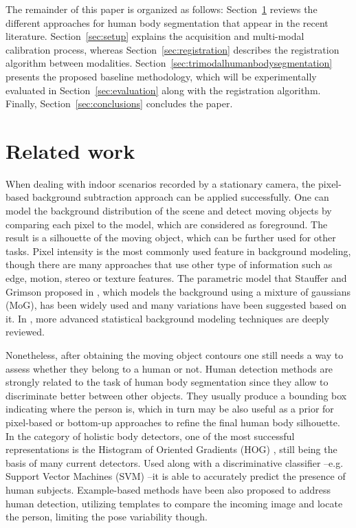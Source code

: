 \documentclass[10pt,twocolumn,letterpaper]{article}
\begin{document}
The remainder of this paper is organized as follows: Section~\ref{sec:relatedwork} reviews the different approaches for human body segmentation that appear in the recent literature. Section~\ref{sec:setup} explains the acquisition and multi-modal calibration process, whereas Section~\ref{sec:registration} describes the registration algorithm between modalities. Section~\ref{sec:trimodalhumanbodysegmentation} presents the proposed baseline methodology, which will be experimentally evaluated in Section~\ref{sec:evaluation} along with the registration algorithm. Finally, Section~\ref{sec:conclusions} concludes the paper.

\section{Related work}
\label{sec:relatedwork}
 
 When dealing with indoor scenarios recorded by a stationary camera, the pixel-based background subtraction approach can be applied successfully. One can model the background distribution of the scene and detect moving objects by comparing each pixel to the model, which are considered as foreground. The result is a silhouette of the moving object, which can be further used for other tasks. Pixel intensity is the most commonly used feature in background modeling, though there are many approaches that use other type of information such as edge, motion, stereo or texture features. The parametric model that Stauffer and Grimson proposed in \cite{stauffer1999adaptive}, which models the background using a mixture of gaussians (MoG), has been widely used and many variations have been suggested based on it. In \cite{bouwmans2011recent}, more advanced statistical background modeling techniques are deeply reviewed. 
 
Nonetheless, after obtaining the moving object contours one still needs a way to assess whether they belong to a human or not. Human detection methods are strongly related to the task of human body segmentation since they allow to discriminate better between other objects. They usually produce a bounding box indicating where the person is, which in turn may be also useful as a prior for pixel-based or bottom-up approaches to refine the final human body silhouette. In the category of holistic body detectors, one of the most successful representations is the Histogram of Oriented Gradients (HOG) \cite{dalal2005histograms}, still being the basis of many current detectors. Used along with a discriminative classifier --e.g. Support Vector Machines (SVM) \cite{hearst1998support} --it is able to accurately predict the presence of human subjects. Example-based methods \cite{andriluka2010monocular} have been also proposed to address human detection, utilizing templates to compare the incoming image and locate the person, limiting the pose variability though.  
\end{document}
